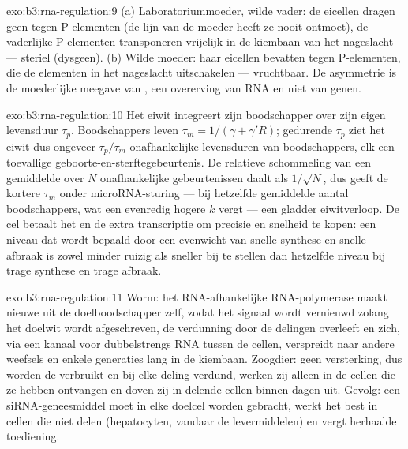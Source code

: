 \begin{solution}{exo:b3:rna-regulation:9}
(a) Laboratoriummoeder, wilde vader: de eicellen dragen geen 
tegen P-elementen (de lijn van de moeder heeft ze nooit ontmoet), de
vaderlijke P-elementen transponeren vrijelijk in de kiembaan van het
nageslacht --- steriel (dysgeen). (b) Wilde moeder: haar eicellen
bevatten  tegen P-elementen, die de elementen in het nageslacht
uitschakelen --- vruchtbaar. De asymmetrie is de moederlijke
meegave van , een overerving van RNA en niet van genen.
\end{solution}

\begin{solution}{exo:b3:rna-regulation:10}
Het eiwit integreert zijn boodschapper over zijn eigen levensduur
$\tau_{p}$. Boodschappers leven $\tau_{m} = 1/(\gamma + \gamma' R)$;
gedurende $\tau_{p}$ ziet het eiwit dus ongeveer $\tau_{p}/\tau_{m}$
onafhankelijke levensduren van boodschappers, elk een toevallige
geboorte-en-sterftegebeurtenis. De relatieve schommeling van een
gemiddelde over $N$ onafhankelijke gebeurtenissen daalt als
$1/\sqrt{N}$, dus geeft de kortere $\tau_{m}$ onder microRNA-sturing
--- bij hetzelfde gemiddelde aantal boodschappers, wat een evenredig
hogere $k$ vergt --- een gladder eiwitverloop. De cel betaalt het
 en de extra transcriptie om precisie en snelheid te kopen:
een niveau dat wordt bepaald door een evenwicht van snelle synthese en
snelle afbraak is zowel minder ruizig als sneller bij te stellen dan
hetzelfde niveau bij trage synthese en trage afbraak.
\end{solution}

\begin{solution}{exo:b3:rna-regulation:11}
Worm: het RNA-afhankelijke RNA-polymerase maakt nieuwe  uit de
doelboodschapper zelf, zodat het signaal wordt vernieuwd zolang het
doelwit wordt afgeschreven, de verdunning door de delingen overleeft
en zich, via een kanaal voor dubbelstrengs RNA tussen de cellen,
verspreidt naar andere weefsels en enkele generaties lang in de
kiembaan. Zoogdier: geen versterking, dus worden de  verbruikt
en bij elke deling verdund, werken zij alleen in de cellen die ze
hebben ontvangen en doven zij in delende cellen binnen dagen uit.
Gevolg: een siRNA-geneesmiddel moet in elke doelcel worden gebracht,
werkt het best in cellen die niet delen (hepatocyten, vandaar de
levermiddelen) en vergt herhaalde toediening.
\end{solution}

